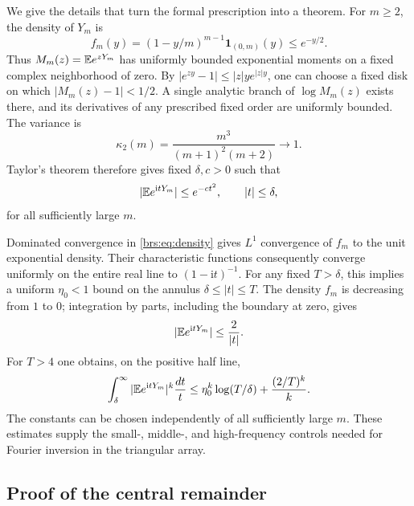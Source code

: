 \documentclass[11pt]{article}
\numberwithin{equation}{section}
\theoremstyle{remark}\newtheorem{remark}[theorem]{Remark}
\newcommand{\ii}{\mathrm i}\newcommand{\sgn}{\operatorname{sgn}}
\begin{document}
We give the details that turn the formal prescription into a theorem.
For $m\geq2$, the density of $Y_m$ is
\begin{equation}\label{brs:eq:density}
 f_m(y)=(1-y/m)^{m-1}\mathbf1_{(0,m)}(y)\leq e^{-y/2}.
\end{equation}
Thus $M_m(z)=\mathbb E e^{zY_m}$ has uniformly bounded exponential moments on a
fixed complex neighborhood of zero.  By
$|e^{zy}-1|\leq |z|y e^{|z|y}$, one can choose a fixed disk on which
$|M_m(z)-1|<1/2$.  A single analytic branch of $\log M_m(z)$ exists there,
and its derivatives of any prescribed fixed order are uniformly bounded.
The variance is
\[
 \kappa_2(m)=\frac{m^3}{(m+1)^2(m+2)}\longrightarrow1.
\]
Taylor's theorem therefore gives fixed $\delta,c>0$ such that
\begin{equation}\label{brs:eq:gaussianbound}
 |\E e^{\ii tY_m}|\leq e^{-ct^2},\qquad |t|\leq\delta,
\end{equation}
for all sufficiently large $m$.

Dominated convergence in \eqref{brs:eq:density} gives $L^1$ convergence of
$f_m$ to the unit exponential density.  Their characteristic functions
consequently converge uniformly on the entire real line to
$(1-\ii t)^{-1}$.  For any fixed $T>\delta$, this implies a uniform
$\eta_0<1$ bound on the annulus $\delta\leq|t|\leq T$.
The density $f_m$ is decreasing from $1$ to $0$; integration by parts,
including the boundary at zero, gives
\begin{equation}\label{brs:eq:tailbound}
 |\E e^{\ii tY_m}|\leq\frac2{|t|}.
\end{equation}
For $T>4$ one obtains, on the positive half line,
\begin{equation}\label{brs:eq:tailintegral}
 \int_\delta^\infty |\E e^{\ii tY_m}|^k\frac{dt}{t}
 \leq\eta_0^k\log(T/\delta)+\frac{(2/T)^k}{k}.
\end{equation}
The constants can be chosen independently of all sufficiently large $m$.
These estimates supply the small-, middle-, and high-frequency controls
needed for Fourier inversion in the triangular array.

\subsection{Proof of the central remainder}
\end{document}
